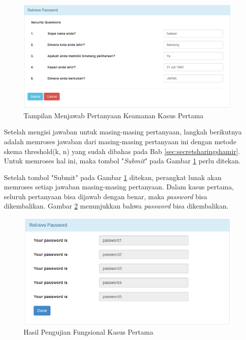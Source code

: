 \begin{figure}[H]
	\includegraphics[scale=0.6]{Gambar/fungsional2}
	\centering
	\caption{Tampilan Menjawab Pertanyaan Keamanan Kasus Pertama}\label{fig:fungsional2}
\end{figure}

Setelah mengisi jawaban untuk masing-masing pertanyaan, langkah berikutnya adalah memroses jawaban dari masing-masing pertanyaan ini dengan metode skema threshold(k, n) yang sudah dibahas pada Bab \ref{sec:secretsharingshamir}. Untuk memroses hal ini, maka tombol "\textit{Submit}" pada Gambar \ref{fig:fungsional2} perlu ditekan.

Setelah tombol "Submit" pada Gambar \ref{fig:fungsional2} ditekan, perangkat lunak akan memroses setiap jawaban masing-masing pertanyaan. Dalam kasus pertama, seluruh pertanyaan bisa dijawab dengan benar, maka \textit{password} bisa dikembalikan. Gambar \ref{fig:fungsional3} menunjukkan bahwa \textit{password} bisa dikembalikan.

\begin{figure}[H]
	\includegraphics[scale=0.7]{Gambar/fungsional3}
	\centering
	\caption{Hasil Pengujian Fungsional Kasus Pertama}\label{fig:fungsional3}
\end{figure}

